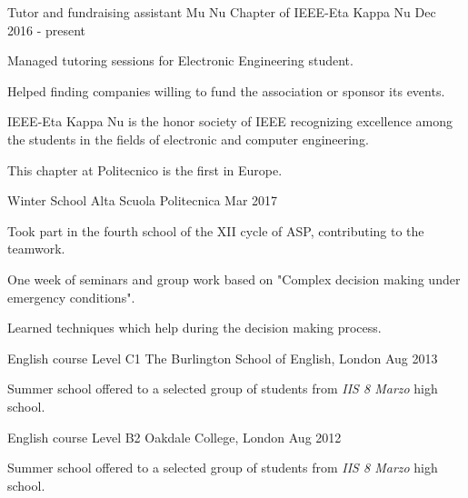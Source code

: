 \begin{cventries}
  \cventry
    {Tutor and fundraising assistant}
    {Mu Nu Chapter of IEEE-Eta Kappa Nu}
    {Dec 2016 - present}
    {}
    {
      \begin{cvitems}
      	\item {Managed tutoring sessions for Electronic Engineering student.}
      	\item {Helped finding companies willing to fund the association or sponsor its events.}
        \item {IEEE-Eta Kappa Nu is the honor society of IEEE recognizing excellence among the students in the fields of electronic and computer engineering.}
        \item {This chapter at Politecnico is the first in Europe.}        
      \end{cvitems}
    }
    
  \cventry
    {Winter School}
    {Alta Scuola Politecnica}
    {Mar 2017}
    {}
    {
      \begin{cvitems}
        \item {Took part in the fourth school of the XII cycle of ASP, contributing to the teamwork.}
        \item {One week of seminars and group work based on "Complex decision making under emergency conditions".}
        \item {Learned techniques which help during the decision making process.}
      \end{cvitems}
    }
    
  \cventry
    {English course Level C1}
    {The Burlington School of English, London}
    {Aug 2013}
    {}
    {
      \begin{cvitems}
        \item {Summer school offered to a selected group of students from \emph{IIS 8 Marzo} high school.}
      \end{cvitems}
    }
    
  \cventry
    {English course Level B2}
    {Oakdale College, London}
    {Aug 2012}
    {}
    {
      \begin{cvitems}
        \item {Summer school offered to a selected group of students from \emph{IIS 8 Marzo} high school.}
      \end{cvitems}
    }
\end{cventries}

\pagebreak
